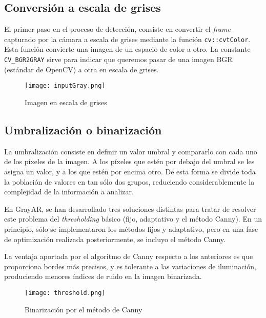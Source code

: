 \subsection{Conversión a escala de grises}
El primer paso en el proceso de detección, consiste en convertir el \textit{frame} capturado por la cámara a escala de grises mediante la función \texttt{cv::cvtColor}. Esta función convierte una imagen de un espacio de color a otro. La constante \texttt{CV\_BGR2GRAY} sirve para indicar que queremos pasar de una imagen BGR (estándar de OpenCV) a otra en escala de grises.

\begin{figure}[h] 
  \centering
  \texttt{[image: inputGray.png]}
  \caption{Imagen en escala de grises}
  \label{fig:grayscale}
\end{figure}


\subsection{Umbralización o binarización}
La umbralización consiste en definir un valor umbral y compararlo con cada uno de los píxeles de la imagen. A los píxeles que estén por debajo del umbral se les asigna un valor, y a los que estén por encima otro. De esta forma se divide toda la población de valores en tan sólo dos grupos, reduciendo considerablemente la complejidad de la información a analizar.

En GrayAR, se han desarrollado tres soluciones distintas para tratar de resolver este problema del \textit{thresholding} básico (fijo, adaptativo y el método Canny). En un principio, sólo se implementaron los métodos fijos y adaptativo, pero en una fase de optimización realizada posteriormente, se incluyo
el método Canny. 

La ventaja aportada por el algoritmo de Canny respecto a los anteriores es que proporciona bordes más precisos, y es tolerante a las variaciones de iluminación, produciendo menores índices de ruido en la imagen binarizada.

\begin{figure}[h] 
  \centering
  \texttt{[image: threshold.png]}
  \caption{Binarización por el método de Canny}
  \label{fig:binarizacion}
\end{figure}

